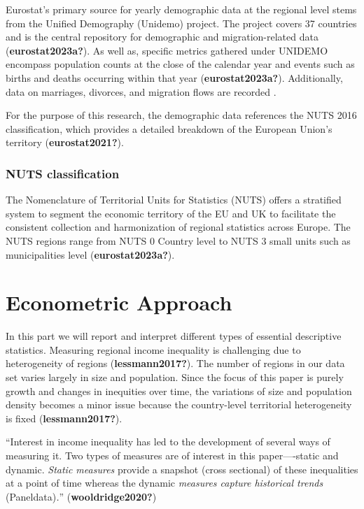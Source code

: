 \documentclass[
  a4paper,
  DIV=11,
  numbers=noendperiod]{scrartcl}
\begin{document}
Eurostat's primary source for yearly demographic data at the regional
level stems from the Unified Demography (Unidemo) project. The project
covers 37 countries and is the central repository for demographic and
migration-related data (\textbf{eurostat2023a?}). As well as, specific
metrics gathered under UNIDEMO encompass population counts at the close
of the calendar year and events such as births and deaths occurring
within that year (\textbf{eurostat2023a?}). Additionally, data on
marriages, divorces, and migration flows are recorded .

For the purpose of this research, the demographic data references the
NUTS 2016 classification, which provides a detailed breakdown of the
European Union's territory (\textbf{eurostat2021?}).

\hypertarget{nuts-classification}{%
\subsubsection{NUTS classification}\label{nuts-classification}}

The Nomenclature of Territorial Units for Statistics (NUTS) offers a
stratified system to segment the economic territory of the EU and UK to
facilitate the consistent collection and harmonization of regional
statistics across Europe. The NUTS regions range from NUTS 0 Country
level to NUTS 3 small units such as municipalities level
(\textbf{eurostat2023a?}). ~

\hypertarget{econometric-approach}{%
\section{Econometric Approach}\label{econometric-approach}}

In this part we will report and interpret different types of essential
descriptive statistics. Measuring regional income inequality is
challenging due to heterogeneity of regions (\textbf{lessmann2017?}).
The number of regions in our data set varies largely in size and
population. Since the focus of this paper is purely growth and changes
in inequities over time, the variations of size and population density
becomes a minor issue because the country-level territorial
heterogeneity is fixed (\textbf{lessmann2017?}).

``Interest in income inequality has led to the development of several
ways of measuring it. Two types of measures are of interest in this
paper----static and dynamic. \emph{Static measures} provide a snapshot
(cross sectional) of these inequalities at a point of time whereas the
dynamic \emph{measures capture historical trends} (Paneldata)\emph{.}''
(\textbf{wooldridge2020?})
\end{document}
